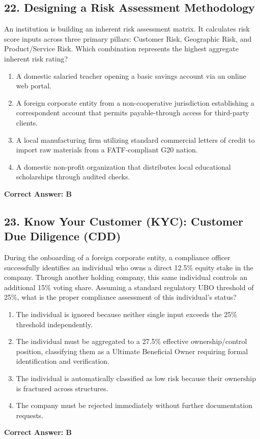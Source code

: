 \documentclass[11pt,a4paper]{article}
\begin{document}
	\subsection{22. Designing a Risk Assessment Methodology}
	An institution is building an inherent risk assessment matrix. It calculates risk score inputs across three primary pillars: Customer Risk, Geographic Risk, and Product/Service Risk. Which combination represents the highest aggregate inherent risk rating?
	\begin{enumerate}[label=\Alph*.]
		\item A domestic salaried teacher opening a basic savings account via an online web portal.
		\item A foreign corporate entity from a non-cooperative jurisdiction establishing a correspondent account that permits payable-through access for third-party clients.
		\item A local manufacturing firm utilizing standard commercial letters of credit to import raw materials from a FATF-compliant G20 nation.
		\item A domestic non-profit organization that distributes local educational scholarships through audited checks.
	\end{enumerate}
	\textbf{Correct Answer: B}
	
	\subsection{23. Know Your Customer (KYC): Customer Due Diligence (CDD)}
	During the onboarding of a foreign corporate entity, a compliance officer successfully identifies an individual who owns a direct 12.5\% equity stake in the company. Through another holding company, this same individual controls an additional 15\% voting share. Assuming a standard regulatory UBO threshold of 25\%, what is the proper compliance assessment of this individual’s status?
	\begin{enumerate}[label=\Alph*.]
		\item The individual is ignored because neither single input exceeds the 25\% threshold independently.
		\item The individual must be aggregated to a 27.5\% effective ownership/control position, classifying them as a Ultimate Beneficial Owner requiring formal identification and verification.
		\item The individual is automatically classified as low risk because their ownership is fractured across structures.
		\item The company must be rejected immediately without further documentation requests.
	\end{enumerate}
	\textbf{Correct Answer: B}
	
\end{document}
